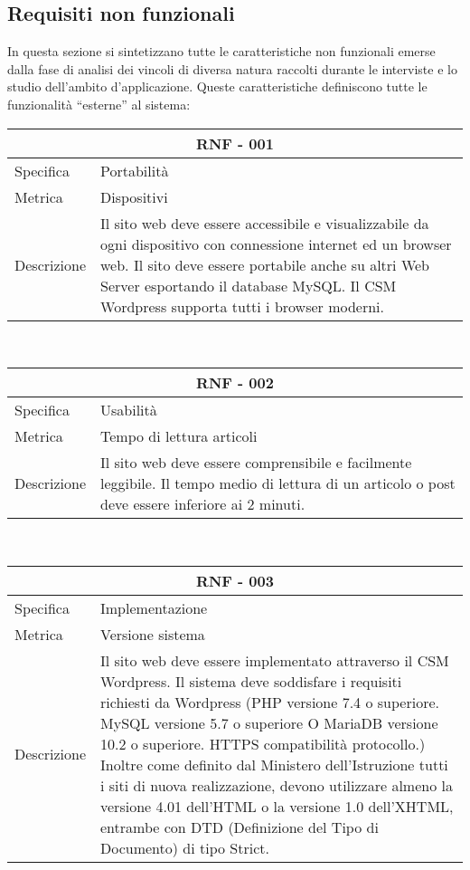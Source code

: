 \documentclass{article}
\begin{document}
\subsection{\textbf{Requisiti non funzionali}}
In questa sezione si sintetizzano tutte le caratteristiche non funzionali emerse dalla fase di  analisi dei vincoli di diversa natura raccolti durante le interviste e lo studio dell'ambito d'applicazione. Queste caratteristiche definiscono tutte le funzionalità “esterne” al sistema:
\vspace{4mm} \vspace{4mm} 
\begin{tabular}{ |p{3cm}|p{8cm}|  }
	\hline
	\multicolumn{2}{|c|}{\textbf{RNF - 001}} \\
	\hline
	Specifica&Portabilità\\
	\hline
	Metrica & Dispositivi\\
	\hline
	Descrizione&Il sito web deve essere accessibile e visualizzabile da ogni dispositivo con connessione internet ed un browser web. Il sito deve essere portabile anche su altri Web Server esportando il database MySQL. Il CSM Wordpress supporta tutti i browser moderni.\\
	\hline
\end{tabular}\\
\vspace{4mm} 
\begin{tabular}{ |p{3cm}|p{8cm}|  }
	\hline
	\multicolumn{2}{|c|}{\textbf{RNF - 002}} \\
	\hline
	Specifica&Usabilità \\
	\hline
	Metrica & Tempo di lettura articoli\\
	\hline
	Descrizione&Il sito web deve essere comprensibile e facilmente leggibile. Il tempo medio di lettura di un articolo o post deve essere inferiore ai 2 minuti.\\
	\hline
\end{tabular}\\
\vspace{4mm} 
\begin{tabular}{ |p{3cm}|p{8cm}|  }
	\hline
	\multicolumn{2}{|c|}{\textbf{RNF - 003}} \\
	\hline
	Specifica &Implementazione\\
	\hline
	Metrica &  Versione sistema\\
	\hline
	Descrizione&Il sito web deve essere implementato attraverso il CSM Wordpress. Il sistema deve soddisfare i requisiti richiesti da Wordpress (PHP versione 7.4 o superiore.
	MySQL versione 5.7 o superiore O MariaDB versione 10.2 o superiore.
	HTTPS compatibilità protocollo.) Inoltre come definito dal Ministero dell'Istruzione tutti i siti di nuova realizzazione, devono utilizzare almeno la versione 4.01 dell'HTML o la versione 1.0 dell'XHTML, entrambe con DTD (Definizione del Tipo di Documento) di tipo Strict.\\
	\hline
\end{tabular}\\
\end{document}
